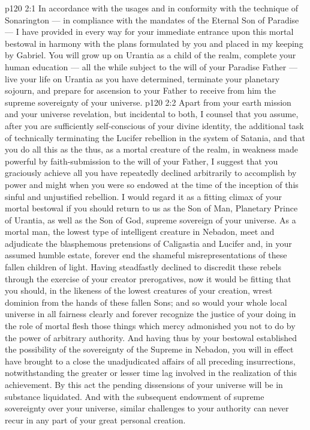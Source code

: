 \vs p120 2:1 \bibnobreakspace In accordance with the usages and in conformity with the technique of Sonarington --- in compliance with the mandates of the Eternal Son of Paradise --- I have provided in every way for your immediate entrance upon this mortal bestowal in harmony with the plans formulated by you and placed in my keeping by Gabriel. You will grow up on Urantia as a child of the realm, complete your human education --- all the while subject to the will of your Paradise Father --- live your life on Urantia as you have determined, terminate your planetary sojourn, and prepare for ascension to your Father to receive from him the supreme sovereignty of your universe.
\vs p120 2:2 \bibnobreakspace Apart from your earth mission and your universe revelation, but incidental to both, I counsel that you assume, after you are sufficiently self\hyp{}conscious of your divine identity, the additional task of technically terminating the Lucifer rebellion in the system of Satania, and that you do all this as the  thus, as a mortal creature of the realm, in weakness made powerful by faith\hyp{}submission to the will of your Father, I suggest that you graciously achieve all you have repeatedly declined arbitrarily to accomplish by power and might when you were so endowed at the time of the inception of this sinful and unjustified rebellion. I would regard it as a fitting climax of your mortal bestowal if you should return to us as the Son of Man, Planetary Prince of Urantia, as well as the Son of God, supreme sovereign of your universe. As a mortal man, the lowest type of intelligent creature in Nebadon, meet and adjudicate the blasphemous pretensions of Caligastia and Lucifer and, in your assumed humble estate, forever end the shameful misrepresentations of these fallen children of light. Having steadfastly declined to discredit these rebels through the exercise of your creator prerogatives, now it would be fitting that you should, in the likeness of the lowest creatures of your creation, wrest dominion from the hands of these fallen Sons; and so would your whole local universe in all fairness clearly and forever recognize the justice of your doing in the role of mortal flesh those things which mercy admonished you not to do by the power of arbitrary authority. And having thus by your bestowal established the possibility of the sovereignty of the Supreme in Nebadon, you will in effect have brought to a close the unadjudicated affairs of all preceding insurrections, notwithstanding the greater or lesser time lag involved in the realization of this achievement. By this act the pending dissensions of your universe will be in substance liquidated. And with the subsequent endowment of supreme sovereignty over your universe, similar challenges to your authority can never recur in any part of your great personal creation.
